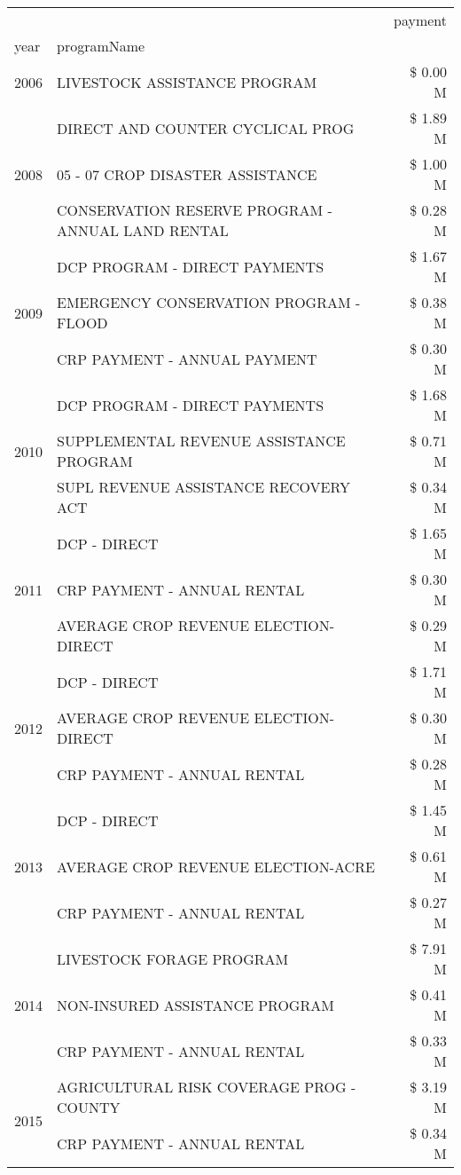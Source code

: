 \begin{tabular}{llr}
\toprule
 &  & payment \\
year & programName &  \\
\midrule
2006 & LIVESTOCK ASSISTANCE PROGRAM & \$ 0.00 M \\
\cline{1-3}
\multirow[t]{3}{*}{2008} & DIRECT AND COUNTER CYCLICAL PROG & \$ 1.89 M \\
 & 05 - 07 CROP DISASTER ASSISTANCE & \$ 1.00 M \\
 & CONSERVATION RESERVE PROGRAM - ANNUAL LAND RENTAL & \$ 0.28 M \\
\cline{1-3}
\multirow[t]{3}{*}{2009} & DCP PROGRAM - DIRECT PAYMENTS & \$ 1.67 M \\
 & EMERGENCY CONSERVATION PROGRAM - FLOOD & \$ 0.38 M \\
 & CRP PAYMENT - ANNUAL PAYMENT & \$ 0.30 M \\
\cline{1-3}
\multirow[t]{3}{*}{2010} & DCP PROGRAM - DIRECT PAYMENTS & \$ 1.68 M \\
 & SUPPLEMENTAL REVENUE ASSISTANCE PROGRAM & \$ 0.71 M \\
 & SUPL REVENUE ASSISTANCE RECOVERY ACT & \$ 0.34 M \\
\cline{1-3}
\multirow[t]{3}{*}{2011} & DCP - DIRECT & \$ 1.65 M \\
 & CRP PAYMENT - ANNUAL RENTAL & \$ 0.30 M \\
 & AVERAGE CROP REVENUE ELECTION-DIRECT & \$ 0.29 M \\
\cline{1-3}
\multirow[t]{3}{*}{2012} & DCP - DIRECT & \$ 1.71 M \\
 & AVERAGE CROP REVENUE ELECTION-DIRECT & \$ 0.30 M \\
 & CRP PAYMENT - ANNUAL RENTAL & \$ 0.28 M \\
\cline{1-3}
\multirow[t]{3}{*}{2013} & DCP - DIRECT & \$ 1.45 M \\
 & AVERAGE CROP REVENUE ELECTION-ACRE & \$ 0.61 M \\
 & CRP PAYMENT - ANNUAL RENTAL & \$ 0.27 M \\
\cline{1-3}
\multirow[t]{3}{*}{2014} & LIVESTOCK FORAGE PROGRAM & \$ 7.91 M \\
 & NON-INSURED ASSISTANCE PROGRAM & \$ 0.41 M \\
 & CRP PAYMENT - ANNUAL RENTAL & \$ 0.33 M \\
\cline{1-3}
\multirow[t]{3}{*}{2015} & AGRICULTURAL RISK COVERAGE PROG - COUNTY & \$ 3.19 M \\
 & CRP PAYMENT - ANNUAL RENTAL & \$ 0.34 M \\

\end{tabular}
